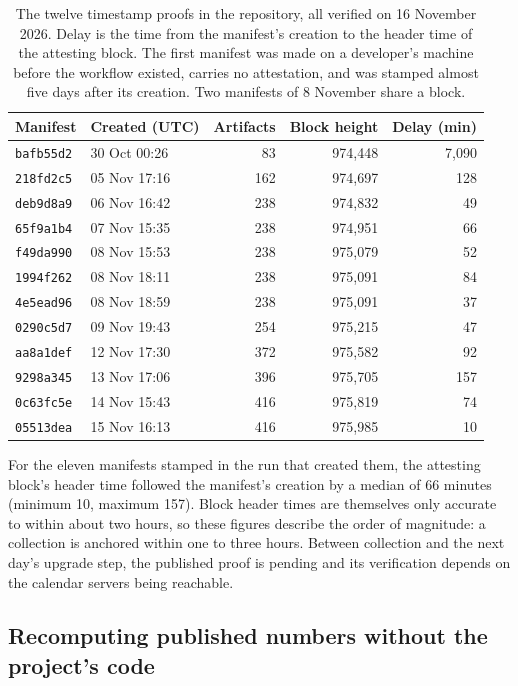 \begin{table}[t]
\centering
\small
\begin{tabular}{@{}llrrr@{}}
\toprule
Manifest & Created (UTC) & Artifacts & Block height & Delay (min) \\
\midrule
\texttt{bafb55d2} & 30 Oct 00:26 & 83  & 974,448 & 7,090 \\
\texttt{218fd2c5} & 05 Nov 17:16 & 162 & 974,697 & 128 \\
\texttt{deb9d8a9} & 06 Nov 16:42 & 238 & 974,832 & 49 \\
\texttt{65f9a1b4} & 07 Nov 15:35 & 238 & 974,951 & 66 \\
\texttt{f49da990} & 08 Nov 15:53 & 238 & 975,079 & 52 \\
\texttt{1994f262} & 08 Nov 18:11 & 238 & 975,091 & 84 \\
\texttt{4e5ead96} & 08 Nov 18:59 & 238 & 975,091 & 37 \\
\texttt{0290c5d7} & 09 Nov 19:43 & 254 & 975,215 & 47 \\
\texttt{aa8a1def} & 12 Nov 17:30 & 372 & 975,582 & 92 \\
\texttt{9298a345} & 13 Nov 17:06 & 396 & 975,705 & 157 \\
\texttt{0c63fc5e} & 14 Nov 15:43 & 416 & 975,819 & 74 \\
\texttt{05513dea} & 15 Nov 16:13 & 416 & 975,985 & 10 \\
\bottomrule
\end{tabular}
\caption{The twelve timestamp proofs in the repository, all verified on 16 November 2026. Delay is the time from the manifest's creation to the header time of the attesting block. The first manifest was made on a developer's machine before the workflow existed, carries no attestation, and was stamped almost five days after its creation. Two manifests of 8 November share a block.}
\label{tab:timestamps}
\end{table}

For the eleven manifests stamped in the run that created them, the attesting block's header time followed the manifest's creation by a median of 66 minutes (minimum 10, maximum 157). Block header times are themselves only accurate to within about two hours, so these figures describe the order of magnitude: a collection is anchored within one to three hours. Between collection and the next day's upgrade step, the published proof is pending and its verification depends on the calendar servers being reachable.

\subsection{Recomputing published numbers without the project's code}
\label{sec:eval-recompute}


